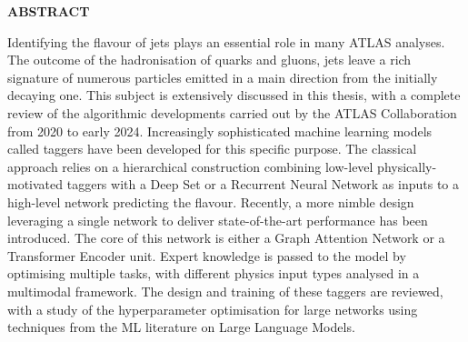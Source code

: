 
\vspace*{\fill}
\begin{center}
\textbf{\large \color{oxfordblue} ABSTRACT}
\end{center}
Identifying the flavour of jets plays an essential role in many ATLAS analyses. The outcome of the hadronisation of quarks and gluons, jets leave a rich signature of numerous particles emitted in a main direction from the initially decaying one. This subject is extensively discussed in this thesis, with a complete review of the algorithmic developments carried out by the ATLAS Collaboration from 2020 to early 2024. Increasingly sophisticated machine learning models called taggers have been developed for this specific purpose. The classical approach relies on a hierarchical construction combining low-level physically-motivated taggers with a Deep Set or a Recurrent Neural Network as inputs to a high-level network predicting the flavour. Recently, a more nimble design leveraging a single network to deliver state-of-the-art performance has been introduced. The core of this network is either a Graph Attention Network or a Transformer Encoder unit. Expert knowledge is passed to the model by optimising multiple tasks, with different physics input types analysed in a multimodal framework. The design and training of these taggers are reviewed, with a study of the hyperparameter optimisation for large networks using techniques from the ML literature on Large Language Models. \\

